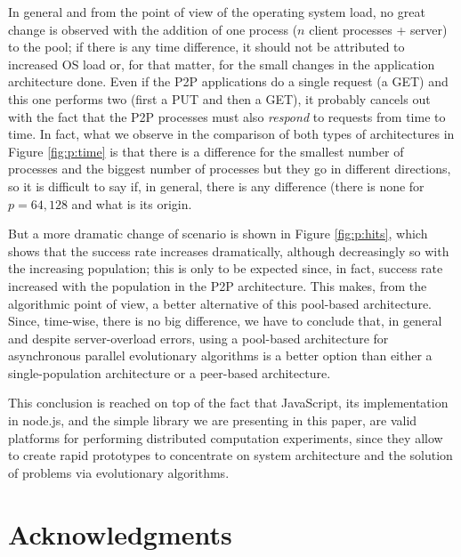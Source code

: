 \documentclass{sig-alternate}
\begin{document}
In general and from the point of view of the operating system load, no
great change is observed with the addition of one process ($n$ client
processes + server) to the pool; if there is any time difference, it
should not be attributed to increased OS load or, for that matter, for
the small changes in the application architecture done. Even if the
P2P applications do a single request (a GET) and this one performs two
(first a PUT and then a GET), it probably cancels out with the fact
that the P2P processes must also {\em respond} to requests from time
to time. In fact, what we observe in the comparison of both types of
architectures in Figure \ref{fig:p:time} is that there is a difference
for the smallest number of processes and the biggest number of
processes but they go in different directions, so it is difficult to
say if, in general, there is any difference (there is none for
$p=64,128$ and what is its origin. 

But a more dramatic change of scenario is shown in Figure
\ref{fig:p:hits}, which shows that the success rate increases
dramatically, although decreasingly so with the increasing population;
this is only to be expected since, in fact, success rate increased
with the population in the P2P architecture. This makes, from the
algorithmic point of view, a better alternative of this pool-based
architecture. Since, time-wise, there is no big difference, we have to
conclude that, in general and despite server-overload errors, using a
pool-based architecture for asynchronous parallel evolutionary
algorithms is a better option than either a single-population
architecture or a peer-based architecture. 

This conclusion is reached on top of the fact that JavaScript, its
implementation in node.js, and the simple library we are presenting in
this paper, are valid platforms for performing distributed computation
experiments, since they allow to create rapid prototypes to
concentrate on system architecture and the solution of problems via
evolutionary algorithms. 



\section{Acknowledgments}


%

\end{document}
